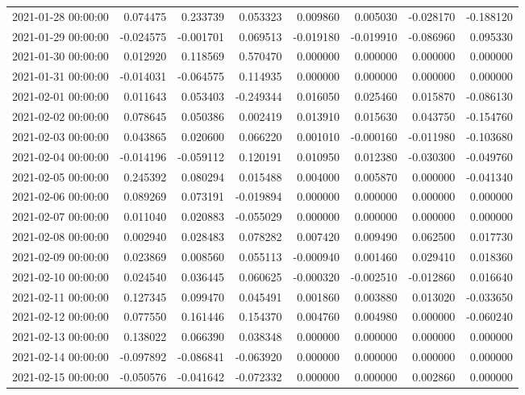\begin{tabular}{lrrrrrrr}
2021-01-28 00:00:00 & 0.074475 & 0.233739 & 0.053323 & 0.009860 & 0.005030 & -0.028170 & -0.188120 \\
2021-01-29 00:00:00 & -0.024575 & -0.001701 & 0.069513 & -0.019180 & -0.019910 & -0.086960 & 0.095330 \\
2021-01-30 00:00:00 & 0.012920 & 0.118569 & 0.570470 & 0.000000 & 0.000000 & 0.000000 & 0.000000 \\
2021-01-31 00:00:00 & -0.014031 & -0.064575 & 0.114935 & 0.000000 & 0.000000 & 0.000000 & 0.000000 \\
2021-02-01 00:00:00 & 0.011643 & 0.053403 & -0.249344 & 0.016050 & 0.025460 & 0.015870 & -0.086130 \\
2021-02-02 00:00:00 & 0.078645 & 0.050386 & 0.002419 & 0.013910 & 0.015630 & 0.043750 & -0.154760 \\
2021-02-03 00:00:00 & 0.043865 & 0.020600 & 0.066220 & 0.001010 & -0.000160 & -0.011980 & -0.103680 \\
2021-02-04 00:00:00 & -0.014196 & -0.059112 & 0.120191 & 0.010950 & 0.012380 & -0.030300 & -0.049760 \\
2021-02-05 00:00:00 & 0.245392 & 0.080294 & 0.015488 & 0.004000 & 0.005870 & 0.000000 & -0.041340 \\
2021-02-06 00:00:00 & 0.089269 & 0.073191 & -0.019894 & 0.000000 & 0.000000 & 0.000000 & 0.000000 \\
2021-02-07 00:00:00 & 0.011040 & 0.020883 & -0.055029 & 0.000000 & 0.000000 & 0.000000 & 0.000000 \\
2021-02-08 00:00:00 & 0.002940 & 0.028483 & 0.078282 & 0.007420 & 0.009490 & 0.062500 & 0.017730 \\
2021-02-09 00:00:00 & 0.023869 & 0.008560 & 0.055113 & -0.000940 & 0.001460 & 0.029410 & 0.018360 \\
2021-02-10 00:00:00 & 0.024540 & 0.036445 & 0.060625 & -0.000320 & -0.002510 & -0.012860 & 0.016640 \\
2021-02-11 00:00:00 & 0.127345 & 0.099470 & 0.045491 & 0.001860 & 0.003880 & 0.013020 & -0.033650 \\
2021-02-12 00:00:00 & 0.077550 & 0.161446 & 0.154370 & 0.004760 & 0.004980 & 0.000000 & -0.060240 \\
2021-02-13 00:00:00 & 0.138022 & 0.066390 & 0.038348 & 0.000000 & 0.000000 & 0.000000 & 0.000000 \\
2021-02-14 00:00:00 & -0.097892 & -0.086841 & -0.063920 & 0.000000 & 0.000000 & 0.000000 & 0.000000 \\
2021-02-15 00:00:00 & -0.050576 & -0.041642 & -0.072332 & 0.000000 & 0.000000 & 0.002860 & 0.000000 \\

\end{tabular}
